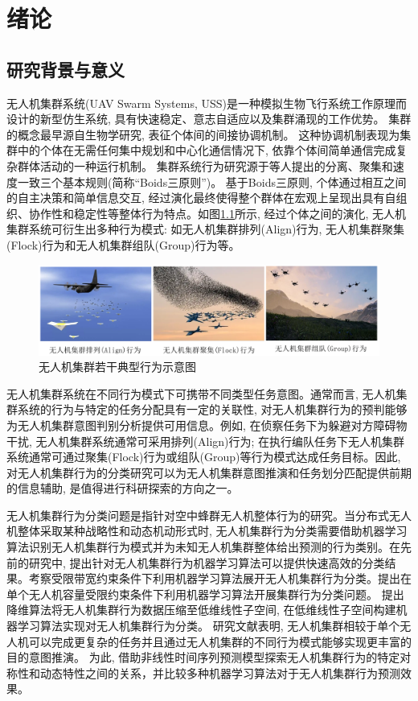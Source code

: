 \chapter{绪论}
\label{chap:introduction}

\section{研究背景与意义}
无人机集群系统(UAV Swarm Systems, USS)是一种模拟生物飞行系统工作原理而设计的新型仿生系统, 具有快速稳定、意志自适应以及集群涌现的工作优势。 集群的概念最早源自生物学研究, 表征个体间的间接协调机制。 这种协调机制表现为集群中的个体在无需任何集中规划和中心化通信情况下, 依靠个体间简单通信完成复杂群体活动的一种运行机制。 集群系统行为研究源于\citet{Flocks1987}等人提出的分离、聚集和速度一致三个基本规则(简称“Boids三原则”)。 基于Boids三原则, 个体通过相互之间的自主决策和简单信息交互, 经过演化最终使得整个群体在宏观上呈现出具有自组织、协作性和稳定性等整体行为特点。如图\ref{fig:swarm}所示, 经过个体之间的演化, 无人机集群系统可衍生出多种行为模式: 如无人机集群排列(Align)行为, 无人机集群聚集(Flock)行为和无人机集群组队(Group)行为等。

\begin{figure}
\centering
\includegraphics[width=1\linewidth]{Img/chapter0/swarm.png}
\caption{无人机集群若干典型行为示意图}
\label{fig:swarm}
\end{figure}

无人机集群系统在不同行为模式下可携带不同类型任务意图。通常而言, 无人机集群系统的行为与特定的任务分配具有一定的关联性, 对无人机集群行为的预判能够为无人机集群意图判别分析提供可用信息。例如, 在侦察任务下为躲避对方障碍物干扰, 无人机集群系统通常可采用排列(Align)行为; 在执行编队任务下无人机集群系统通常可通过聚集(Flock)行为或组队(Group)等行为模式达成任务目标。因此, 对无人机集群行为的分类研究可以为无人机集群意图推演和任务划分匹配提供前期的信息辅助, 是值得进行科研探索的方向之一。

无人机集群行为分类问题是指针对空中蜂群无人机整体行为的研究。当分布式无人机整体采取某种战略性和动态机动形式时, 无人机集群行为分类需要借助机器学习算法识别无人机集群行为模式并为未知无人机集群整体给出预测的行为类别\citep{Chung2018}。在先前的研究中, \citet{Hamann2018}提出针对无人机集群行为机器学习算法可以提供快速高效的分类结果。\citet{Brown2014}考察受限带宽约束条件下利用机器学习算法展开无人机集群行为分类。\citet{Brown2016DiscoveryAE}提出在单个无人机容量受限约束条件下利用机器学习算法开展集群行为分类问题。 \citet{Berger2016}提出降维算法将无人机集群行为数据压缩至低维线性子空间, 在低维线性子空间构建机器学习算法实现对无人机集群行为分类。 研究文献表明, 无人机集群相较于单个无人机可以完成更复杂的任务并且通过无人机集群的不同行为模式能够实现更丰富的目的意图推演\citep{Olaronke2020,Schranz2020}。 为此, \citet{Thomas2021}借助非线性时间序列预测模型探索无人机集群行为的特定对称性和动态特性之间的关系，并比较多种机器学习算法对于无人机集群行为预测效果。

